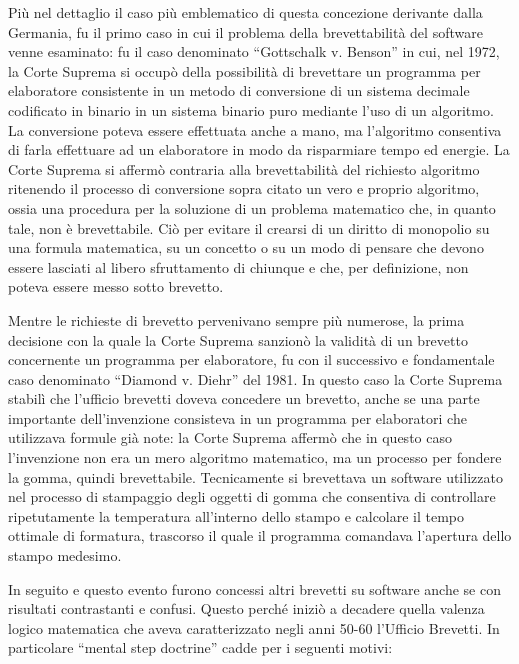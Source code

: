 Più nel dettaglio il caso più emblematico di questa concezione derivante dalla Germania, fu il primo caso in cui il problema della brevettabilità del software venne esaminato: fu il caso denominato ``Gottschalk v. Benson'' in cui, nel 1972, la Corte Suprema si occupò della possibilità di brevettare un programma per elaboratore consistente in un metodo di conversione di un sistema decimale codificato in binario in un sistema binario puro mediante l'uso di un algoritmo. La conversione poteva essere effettuata anche a mano, ma l'algoritmo consentiva di farla effettuare ad un elaboratore in modo da risparmiare tempo ed energie. La Corte Suprema si affermò contraria alla brevettabilità del richiesto algoritmo ritenendo il processo di conversione sopra citato un vero e proprio algoritmo, ossia una procedura per la soluzione di un problema matematico che, in quanto tale, non è brevettabile. Ciò per evitare il crearsi di un diritto di monopolio su una formula matematica, su un concetto o su un modo di pensare che devono essere lasciati al libero sfruttamento di chiunque e che, per definizione, non poteva essere messo sotto brevetto.

Mentre le richieste di brevetto pervenivano sempre più numerose, la prima decisione con la quale la Corte Suprema sanzionò la validità di un brevetto concernente un programma per elaboratore, fu con il successivo e fondamentale caso denominato ``Diamond v. Diehr'' del 1981. In questo caso la Corte Suprema stabilì che l'ufficio brevetti doveva concedere un brevetto, anche se una parte importante dell'invenzione consisteva in un programma per elaboratori che utilizzava formule già note: la Corte Suprema affermò che in questo caso l'invenzione non era un mero algoritmo matematico, ma un processo per fondere la gomma, quindi brevettabile. Tecnicamente si brevettava un software utilizzato nel processo di stampaggio degli oggetti di gomma che consentiva di controllare ripetutamente la temperatura all'interno dello stampo e calcolare il tempo ottimale di formatura, trascorso il quale il programma comandava l'apertura dello stampo medesimo.

In seguito e questo evento furono concessi altri brevetti su software anche se con risultati contrastanti e confusi. Questo perché iniziò a decadere quella valenza logico matematica che aveva caratterizzato negli anni 50-60 l'Ufficio Brevetti. In particolare ``mental step doctrine'' cadde per i seguenti motivi:

